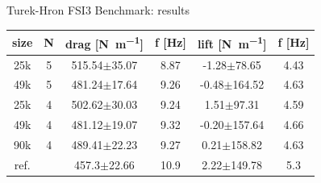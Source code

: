 \documentclass[10pt,t]{beamer}
\begin{document}
\begin{frame}{Turek-Hron FSI3 Benchmark: results}
\footnotesize
\begin{table}[h!]
\label{tab:fsi3_f}
\begin{center}
\begin{tabular}{ c | c | c c | c c  }
size & N & drag [\si{N.m^{-1}}] & f [\si{Hz}] & lift [\si{N.m^{-1}}]  & f [\si{Hz}] \\
\hline
25k & 5   & 515.54$\pm$35.07 & 8.87 & -1.28$\pm$78.65 & 4.43   \\
\hline
49k & 5    & 481.24$\pm$17.64   & 9.26 & -0.48$\pm$164.52 & 4.63 \\
\hline
25k & 4   & 502.62$\pm$30.03 & 9.24 & 1.51$\pm$97.31 & 4.59   \\
\hline
49k & 4    & 481.12$\pm$19.07   & 9.32 & -0.20$\pm$157.64 & 4.66 \\
\hline
90k & 4    & 489.41$\pm$22.23   & 9.27 & 0.21$\pm$158.82 & 4.63 \\
\hline
\hline
ref. &   &  457.3$\pm$22.66  & 10.9 & 2.22$\pm$149.78 & 5.3  \\
\hline
\end{tabular}
\end{center}
\end{table}

\end{frame}
\end{document}

